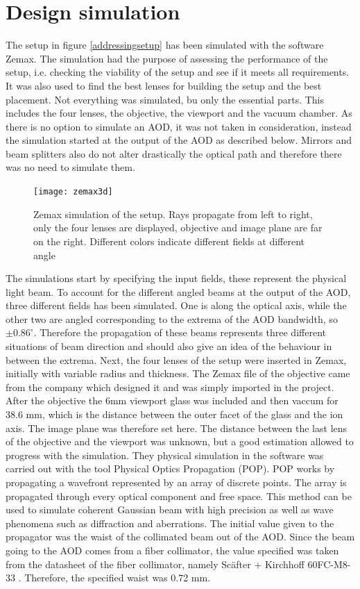 \section{Design simulation}
The setup in figure \ref{addressingsetup} has been simulated with the software Zemax. The simulation had the purpose of assessing the performance of the setup, i.e. checking the viability of the setup and see if it meets all requirements. It was also used to find the best lenses for building the setup and the best placement. Not everything was simulated, bu only the essential parts. This includes the four lenses, the objective, the viewport and the vacuum chamber. As there is no option to simulate an AOD, it was not taken in consideration, instead the simulation started at the output of the AOD as described below. Mirrors and beam splitters also do not alter drastically the optical path and therefore there was no need to simulate them.
\begin{figure}[H]
\centering
\texttt{[image: zemax3d]}
\caption{Zemax simulation of the setup. Rays propagate from left to right, only the four lenses are displayed, objective and image plane are far on the right. Different colors indicate different fields at different angle}
\label{zemaxview}
\end{figure}
The simulations start by specifying the input fields, these represent the physical light beam. To account for the different angled beams at the output of the AOD, three different fields has been simulated. One is along the optical axis, while the other two are angled corresponding to the extrema of the AOD bandwidth, so $\pm0.86^{\circ}$. Therefore the propagation of these beams represents three different situations of beam direction and should also give an idea of the behaviour in between the extrema. Next, the four lenses of the setup were inserted in Zemax, initially with variable radius and thickness. The Zemax file of the objective came from the company which designed it and was simply imported in the project. After the objective the 6mm viewport glass was included and then vaccum for 38.6 mm, which is the distance between the outer facet of the glass and the ion axis. The image plane was therefore set here. The distance between the last lens of the objective and the viewport was unknown, but a good estimation allowed to progress with the simulation.
They physical simulation in the software was carried out with the tool Physical Optics Propagation (POP). POP works by propagating a wavefront represented by an array of discrete points. The array is propagated through every optical component and free space. This method can be used to simulate coherent Gaussian beam with high precision as well as wave phenomena such as diffraction and aberrations. The initial value given to the propagator was the waist of the collimated beam out of the AOD. Since the beam going to the AOD comes from a fiber collimator, the value specified was taken from the datasheet of the fiber collimator, namely Sc\"after + Kirchhoff 60FC-M8-33 \cite{fibercollimator}. Therefore, the specified waist was 0.72 mm.\\
